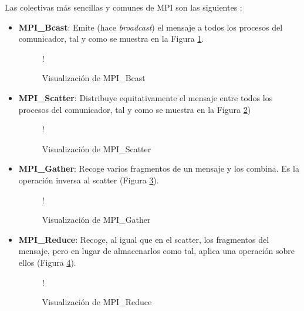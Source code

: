 Las colectivas más sencillas y comunes de MPI son las siguientes \cite{cheung_mpi}:
\begin{itemize}
  \item \textbf{MPI\_Bcast}: Emite (hace \textit{broadcast}) el mensaje a todos los procesos del comunicador, tal y como se muestra en la Figura \ref{fig:mpi_bcast}.
  
  \begin{figure}[H]
    \vspace*{0.5cm}
    \centering
     {!} {
    
    }
    \caption{Visualización de MPI\_Bcast}
    \label{fig:mpi_bcast}
  \end{figure}

  \item \textbf{MPI\_Scatter}: Distribuye equitativamente el mensaje entre todos los procesos del comunicador, tal y como se muestra en la Figura \ref{fig:mpi_scatter})

  \begin{figure}[H]
    \vspace*{0.5cm}
    \centering
     {!} {
    
    }
    \caption{Visualización de MPI\_Scatter}
    \label{fig:mpi_scatter}
  \end{figure}

  \item \textbf{MPI\_Gather}: Recoge varios fragmentos de un mensaje y los combina. Es la operación inversa al scatter (Figura \ref{fig:mpi_gather}).

  \begin{figure}[H]
    \vspace*{0.5cm}
    \centering
     {!} {
    
    }
    \caption{Visualización de MPI\_Gather}
    \label{fig:mpi_gather}
  \end{figure}

  \item \textbf{MPI\_Reduce}: Recoge, al igual que en el scatter, los fragmentos del mensaje, pero en lugar de almacenarlos como tal, aplica una operación sobre ellos (Figura \ref{fig:mpi_reduce}).

  \begin{figure}[H]
    \vspace*{0.5cm}
    \centering
     {!} {
    
    }
    \caption{Visualización de MPI\_Reduce}
    \label{fig:mpi_reduce}
  \end{figure}

\end{itemize}

